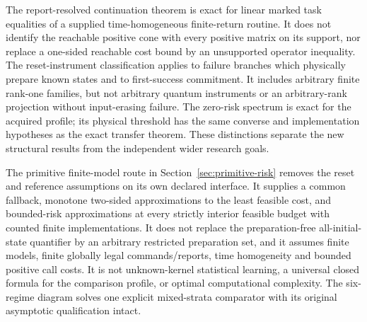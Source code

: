 

The report-resolved continuation theorem is exact for linear marked task equalities of a supplied time-homogeneous finite-return routine. It does not identify the reachable positive cone with every positive matrix on its support, nor replace a one-sided reachable cost bound by an unsupported operator inequality. The reset-instrument classification applies to failure branches which physically prepare known states and to first-success commitment. It includes arbitrary finite rank-one families, but not arbitrary quantum instruments or an arbitrary-rank projection without input-erasing failure. The zero-risk spectrum is exact for the acquired profile; its physical threshold has the same converse and implementation hypotheses as the exact transfer theorem. These distinctions separate the new structural results from the independent wider research goals.


The primitive finite-model route in Section~\ref{sec:primitive-risk} removes the reset and reference assumptions on its own declared interface. It supplies a common fallback, monotone two-sided approximations to the least feasible cost, and bounded-risk approximations at every strictly interior feasible budget with counted finite implementations. It does not replace the preparation-free all-initial-state quantifier by an arbitrary restricted preparation set, and it assumes finite models, finite globally legal commands/reports, time homogeneity and bounded positive call costs. It is not unknown-kernel statistical learning, a universal closed formula for the comparison profile, or optimal computational complexity. The six-regime diagram solves one explicit mixed-strata comparator with its original asymptotic qualification intact.
